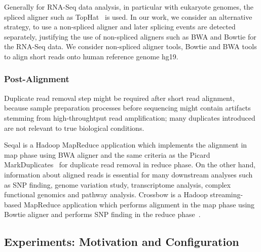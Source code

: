 \documentclass{acm_proc_article-sp}
\begin{document}
Generally for RNA-Seq data analysis, in particular with eukaryote
genomes, the spliced aligner such as TopHat~\cite{pepke2009} is
used. In our work, we consider an alternative strategy, to use a
non-spliced aligner and later splicing events are detected separately,
justifying the use of non-spliced aligners such as BWA and Bowtie for
the RNA-Seq data. We consider non-spliced aligner tools, Bowtie and
BWA tools to align short reads onto human reference genome hg19.

\subsubsection{Post-Alignment}
Duplicate read removal step might be required after short read
alignment, because sample preparation processes before sequencing
might contain artifacts stemming from high-throughtput read
amplification; many duplicates introduced are not relevant to true
biological conditions. 

Seqal is a Hadoop MapReduce application which implements the alignment
in map phase using BWA aligner and the same criteria as the Picard
MarkDuplicates~\cite{seal2011,seal_2011_mapred} for duplicate read
removal in reduce phase.  On the other hand, information about aligned
reads is essential for many downstream analyses such as SNP finding,
genome variation study, transcriptome analysis, complex functional
genomics and pathway analysis.  Crossbow is a Hadoop streaming-based
MapReduce application which performs alignment in the map phase using
Bowtie aligner and performs SNP finding in the reduce
phase~\cite{langmead2009}.


\subsection{Experiments: Motivation and Configuration}


\end{document}
